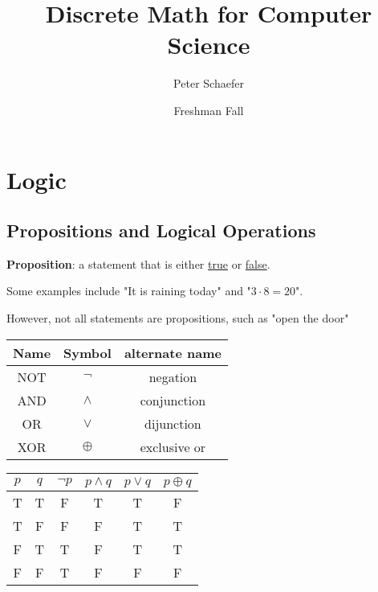\documentclass{article}
\title{Discrete Math for Computer Science}
\author{Peter Schaefer}
\date{Freshman Fall}
\begin{document}
\maketitle

\tableofcontents

\newpage

\section{Logic}
\subsection{Propositions and Logical Operations}

\textbf{Proposition}: a statement that is either \underline{true} or \underline{false}.


Some examples include "It is raining today" and "\(3 \cdot 8 = 20 \)".


However, not all statements are propositions, such as "open the door"

\begin{center}
  \begin{tabular}{c|c|c}
    \textbf{Name} & \textbf{Symbol} & \textbf{alternate name} \\
    \hline
    NOT           & $\lnot$         & negation                \\
    AND           & $\land$         & conjunction             \\
    OR            & $\lor$          & dijunction              \\
    XOR           & $\oplus$        & exclusive or            \\
  \end{tabular}
  \qquad
  \begin{tabular}{c|c|c|c|c|c}
    \textbf{$p$} & \textbf{$q$} & \textbf{$\lnot p$} & \textbf{$p \land q$} & \textbf{$p \lor q$} & \textbf{$p \oplus q$} \\
    \hline
    T            & T            & F                  & T                    & T                   & F                     \\
    T            & F            & F                  & F                    & T                   & T                     \\
    F            & T            & T                  & F                    & T                   & T                     \\
    F            & F            & T                  & F                    & F                   & F                     \\
  \end{tabular}
\end{center}
\end{document}
